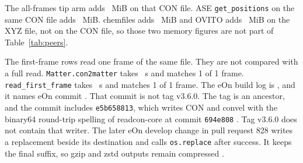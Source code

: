 \documentclass[preprint,12pt]{elsarticle}
\begin{document}
The all-frames tip arm adds \rcTipMib~MiB on that CON file.
ASE \texttt{get\_positions} on the same CON file adds \rcAseMib~MiB.
chemfiles adds \rcChemMib~MiB and OVITO adds \rcOvitoMib~MiB on the XYZ
file, not on the CON file, so those two memory figures are not part of
Table~\ref{tab:peers}.

The first-frame rows read one frame of the same file.
They are not compared with a full read.
\texttt{Matter.con2matter} takes \rcMatterMedian~s and matches 1 of 1
frame.
\texttt{read\_first\_frame} takes \rcFirstMedian~s and matches 1 of 1
frame.
The eOn build log is , and it names
eOn commit \texttt{}.
That commit is not tag v3.6.0.
The tag is an ancestor, and the commit includes
\texttt{e5b658813}, which writes CON and convel with the binary64
round-trip spelling of readcon-core at commit \texttt{694e808}
\cite{goswamiEonRoundtripWriter2026}.
Tag v3.6.0 does not contain that writer.
The later eOn develop change in pull request 828 writes a replacement
beside its destination and calls \texttt{os.replace} after success.
It keeps the final suffix, so gzip and zstd outputs remain compressed
\cite{goswamiEonAtomicSavecon2026}.
\end{document}
